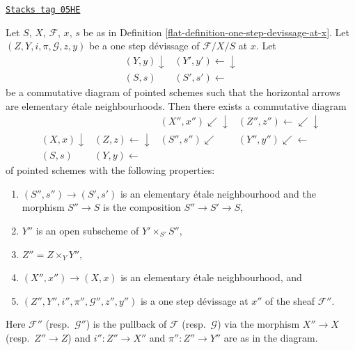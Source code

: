 \begin{lemma}
\label{flat-lemma-elementary-etale-neighbourhood}
\href{https://stacks.math.columbia.edu/tag/05HE}{\texttt{Stacks tag 05HE}}

Let $S$, $X$, $\mathcal{F}$, $x$, $s$ be as in
Definition \ref{flat-definition-one-step-devissage-at-x}.
Let $(Z, Y, i, \pi, \mathcal{G}, z, y)$ be a one step d\'evissage
of $\mathcal{F}/X/S$ at $x$. Let
$$
\begin{array}{cc}(Y, y) \downarrow & (Y', y') \longleftarrow\downarrow \\ (S, s) & (S', s') \longleftarrow\end{array}
$$
be a commutative diagram of pointed schemes such that the horizontal
arrows are elementary \'etale neighbourhoods. Then there exists
a commutative diagram
$$
\begin{array}{cccc} &  & (X'', x'') \swarrow\downarrow & (Z'', z'') \longleftarrow\swarrow\downarrow \\ (X, x) \downarrow & (Z, z) \longleftarrow\downarrow & (S'', s'') \swarrow & (Y'', y'') \swarrow\longleftarrow \\ (S, s) & (Y, y) \longleftarrow &  & \end{array}
$$
of pointed schemes with the following properties:
\begin{enumerate}
\item $(S'', s'') \to (S', s')$ is an elementary \'etale neighbourhood and
the morphism $S'' \to S$ is the composition $S'' \to S' \to S$,
\item $Y''$ is an open subscheme of $Y' \times_{S'} S''$,
\item $Z'' = Z \times_Y Y''$,
\item $(X'', x'') \to (X, x)$ is an elementary \'etale neighbourhood, and
\item $(Z'', Y'', i'', \pi'', \mathcal{G}'', z'', y'')$ is a one step
d\'evissage at $x''$ of the sheaf $\mathcal{F}''$.
\end{enumerate}
Here $\mathcal{F}''$ (resp.\ $\mathcal{G}''$) is the pullback of
$\mathcal{F}$ (resp.\ $\mathcal{G}$) via the morphism $X'' \to X$
(resp.\ $Z'' \to Z$) and $i'' : Z'' \to X''$ and $\pi'' : Z'' \to Y''$
are as in the diagram.
\end{lemma}

